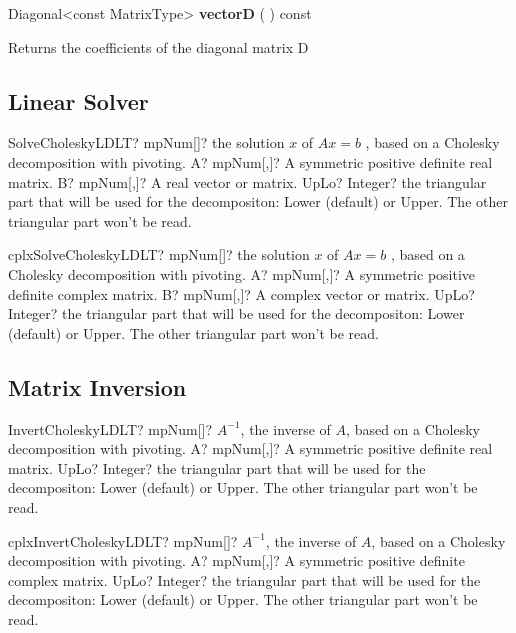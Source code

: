 \vspace{0.3cm}
Diagonal<const MatrixType> \textbf{vectorD}  ( )  const 

Returns the coefficients of the diagonal matrix D 



\subsection{Linear Solver}

\begin{mpFunctionsExtract}
	\mpFunctionThree
	{SolveCholeskyLDLT? mpNum[]? the solution $x$ of $A x = b$ , based on a Cholesky decomposition with pivoting.}
	{A? mpNum[,]? A symmetric positive definite real matrix.}
	{B? mpNum[,]? A real vector or matrix.}
	{UpLo? Integer? the triangular part that will be used for the decompositon: Lower (default) or Upper. The other triangular part won't be read.}
\end{mpFunctionsExtract}


\vspace{0.6cm}
\begin{mpFunctionsExtract}
	\mpFunctionThree
	{cplxSolveCholeskyLDLT? mpNum[]? the solution $x$ of $A x = b$ , based on a Cholesky decomposition with pivoting.}
	{A? mpNum[,]? A symmetric positive definite complex matrix.}
	{B? mpNum[,]? A complex vector or matrix.}
	{UpLo? Integer? the triangular part that will be used for the decompositon: Lower (default) or Upper. The other triangular part won't be read.}
\end{mpFunctionsExtract}




\subsection{Matrix Inversion}

\begin{mpFunctionsExtract}
	\mpFunctionTwo
	{InvertCholeskyLDLT? mpNum[]? $A^{-1}$, the inverse of $A$, based on a Cholesky decomposition with pivoting.}
	{A? mpNum[,]? A symmetric positive definite real matrix.}
	{UpLo? Integer? the triangular part that will be used for the decompositon: Lower (default) or Upper. The other triangular part won't be read.}
\end{mpFunctionsExtract}

\vspace{0.6cm}
\begin{mpFunctionsExtract}
	\mpFunctionTwo
	{cplxInvertCholeskyLDLT? mpNum[]? $A^{-1}$, the inverse of $A$, based on a Cholesky decomposition with pivoting.}
	{A? mpNum[,]? A symmetric positive definite complex matrix.}
	{UpLo? Integer? the triangular part that will be used for the decompositon: Lower (default) or Upper. The other triangular part won't be read.}
\end{mpFunctionsExtract}




